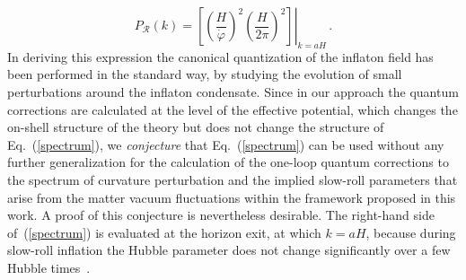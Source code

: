 \documentclass[aps,12pt,superscriptaddress,preprintnumbers,
                secnumarabic,nofootinbib,showpacs]{revtex4}
\begin{document}
\begin{equation}
P_{\mathcal{R}}(k) = \left.\left[
\left(\frac{H}{\dot{\varphi}}\right)^2\left(\frac{H}{2\pi}\right)^2\right]\right|_{k=aH}\,.
\label{spectrum}
\end{equation}
In deriving this expression the canonical quantization of the inflaton field
has been performed in the standard way, by studying the evolution of
small perturbations around the inflaton condensate.
Since in our approach the quantum corrections are calculated
 at the level of the effective potential,
which changes the on-shell structure of the theory but does not
change the structure of Eq.~(\ref{spectrum}), we {\it conjecture}
that Eq.~(\ref{spectrum}) can be used without any further
generalization for the calculation of the one-loop quantum
corrections to the spectrum of curvature perturbation and the
implied slow-roll parameters that arise from the matter vacuum
fluctuations within the framework proposed in this work. A proof
of this conjecture is nevertheless desirable. The right-hand side
of~(\ref{spectrum}) is evaluated at the horizon exit, at which
$k=aH$, because during slow-roll inflation the Hubble parameter
does not change significantly over a few Hubble
times~\cite{Liddle:2000cg}.
\end{document}

